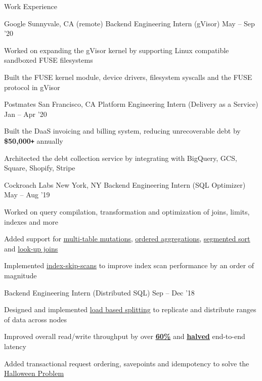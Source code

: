 \documentclass{resume} %
\begin{document}
\begin{rSection}{Work Experience}
  \begin{rWorkSection}{Google}
		     {Sunnyvale, CA (remote)}
		     {Backend Engineering Intern (gVisor)}
		     {May -- Sep '20}
    {
      \item Worked on expanding the gVisor kernel by supporting Linux
        compatible sandboxed FUSE filesystems 
      \item Built
        the FUSE kernel module, device drivers, filesystem syscalls and the FUSE protocol in gVisor
    }
  \end{rWorkSection}
  \begin{rWorkSection}{Postmates}
		     {San Francisco, CA}
		     {Platform Engineering Intern (Delivery as a Service)}
		     {Jan -- Apr '20}
    {
      \item Built the DaaS invoicing and
        billing system, reducing unrecoverable debt by \textbf{\$50,000\texttt{+}} annually
      \item Architected the debt collection service by integrating with
        BigQuery, GCS, Square, Shopify, Stripe
    }
  \end{rWorkSection}
  \begin{rDualWorkSection}{Cockroach Labs}
         {New York, NY}
         {Backend Engineering Intern (SQL Optimizer)}
         {May -- Aug '19}
    {
       \item Worked on query compilation, transformation and
         optimization of joins, limits, indexes and more
       \item Added support for  
         \href{https://github.com/cockroachdb/cockroach/pull/38452}{\ul{multi-table
           mutations}}, 
         \href{https://github.com/cockroachdb/cockroach/pull/38452}{\underline{ordered
           aggregations}}, 
         \href{https://github.com/cockroachdb/cockroach/pull/38452}{\underline{segmented
             sort}} and 
         \href{https://github.com/cockroachdb/cockroach/pull/38285}{\underline{look-up
           joins}}
       \item Implemented
         \href{https://github.com/cockroachdb/cockroach/pull/39668}{\ul{index-skip-scans}}
         to improve index scan performance by an order of magnitude
    }
    {Backend Engineering Intern (Distributed SQL)}
    {Sep -- Dec '18}
    {
       \item Designed and implemented \href{https://github.com/cockroachdb/cockroach/pull/31413}
      {\underline{load based splitting}} to replicate
      and distribute ranges of data across nodes
    \item Improved overall read/write throughput by over
         \setul{4pt}{.4pt}
         \href{https://github.com/cockroachdb/cockroach/issues/31819}{\textbf{\ul{60\%}}}
         and
         \href{https://github.com/cockroachdb/cockroach/issues/31819}{\textbf{\ul{halved}}}
         end-to-end latency
       \item Added transactional request
           ordering, savepoints and idempotency to solve the 
         \setul{4pt}{.4pt}
         \href{https://github.com/cockroachdb/cockroach/pull/33244}{\ul{Halloween
             Problem}}
    }
  \end{rDualWorkSection}


\end{rSection}
\end{document}
